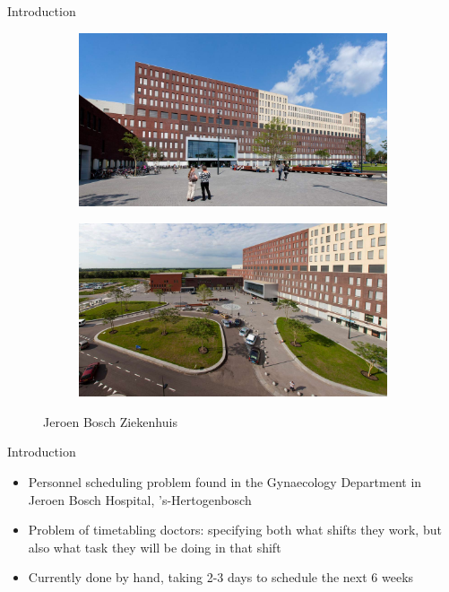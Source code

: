 \documentclass{beamer}
\begin{document}
\begin{frame}{Introduction}
    \begin{figure}
        \centering
        \begin{subfigure}{.45\textwidth}
            \centering
            \includegraphics[width=\linewidth]{img/hospital1}
            \caption{}
        \end{subfigure}
        \hfill
        \begin{subfigure}{.45\textwidth}
            \centering
            \includegraphics[width=\linewidth]{img/hospital2}
            \caption{}
        \end{subfigure}
        \caption{Jeroen Bosch Ziekenhuis}
    \end{figure}
\end{frame}

\begin{frame}{Introduction}
    \begin{itemize}
        \item Personnel scheduling problem found in the Gynaecology Department in Jeroen Bosch Hospital, 's-Hertogenbosch
        \item Problem of timetabling doctors: specifying both what shifts they work, but also what task they will be doing in that shift
        \item Currently done by hand, taking 2-3 days to schedule the next 6 weeks
    \end{itemize}
\end{frame}
\end{document}
